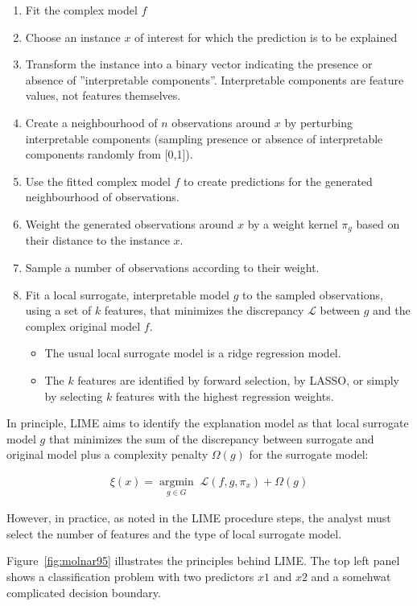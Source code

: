 \begin{enumerate}
\item Fit the complex model $f$
\item Choose an instance $x$ of interest for which the prediction is to be explained
\item Transform the instance into a binary vector indicating the presence or absence of ''interpretable components''. Interpretable components are feature values, not features themselves.
\item Create a neighbourhood of $n$ observations around $x$ by perturbing interpretable components (sampling presence or absence of interpretable components randomly from [0,1]).
\item Use the fitted complex model $f$ to create predictions for the generated neighbourhood of observations.
\item Weight the generated observations around $x$ by a weight kernel $\pi_g$ based on their distance to the instance $x$.
\item Sample a number of observations according to their weight.
\item Fit a local surrogate, interpretable model $g$ to the sampled observations, using a set of $k$ features, that minimizes the discrepancy $\mathcal{L}$ between $g$ and the complex original model $f$.
\begin{itemize}
   \item The usual local surrogate model is a ridge regression model.
   \item The $k$ features are identified by forward selection, by LASSO, or simply by selecting $k$ features with the highest regression weights.
\end{itemize}
\end{enumerate}

In principle, LIME aims to identify the explanation model as that local surrogate model $g$ that minimizes the sum of the discrepancy between surrogate and original model plus a complexity penalty $\Omega(g)$ for the surrogate model:

\begin{align*}
\xi(x) = \operatorname*{argmin}_{g \in G} \; \mathcal{L} (f, g, \pi_x) + \Omega(g)
\end{align*}

However, in practice, as noted in the LIME procedure steps, the analyst must select the number of features and the type of local surrogate model.

Figure~\ref{fig:molnar95} illustrates the principles behind LIME. The top left panel shows a classification problem with two predictors $x1$ and $x2$ and a somehwat complicated decision boundary. 


